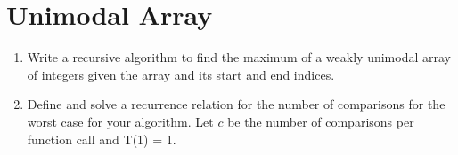 \documentclass[11pt]{article}
\begin{document}
    \section{Unimodal Array}
    \begin{enumerate}
        \item Write a recursive algorithm to find the maximum of a weakly unimodal array of integers given the array and its start and end indices.
        \item Define and solve a recurrence relation for the number of comparisons for the worst case for your algorithm. Let $c$ be the number of comparisons per function call and T(1) = 1.
    \end{enumerate}
    \label{r:lastpage}
    
\end{document}
